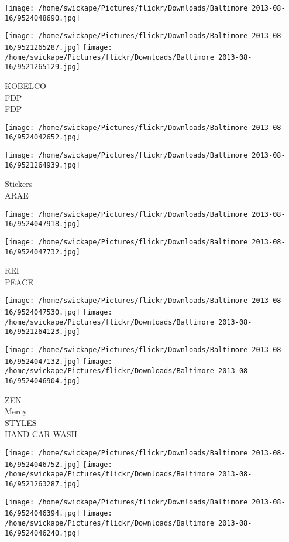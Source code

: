 \documentclass[10pt,letterpaper]{article}
\begin{document}
\texttt{[image: /home/swickape/Pictures/flickr/Downloads/Baltimore 2013-08-16/9524048690.jpg]}

\vspace{0.25in}
\texttt{[image: /home/swickape/Pictures/flickr/Downloads/Baltimore 2013-08-16/9521265287.jpg]}
\texttt{[image: /home/swickape/Pictures/flickr/Downloads/Baltimore 2013-08-16/9521265129.jpg]}

KOBELCO\\
FDP\\
FDP
\pagebreak

\texttt{[image: /home/swickape/Pictures/flickr/Downloads/Baltimore 2013-08-16/9524042652.jpg]}

\vspace{0.25in}
\texttt{[image: /home/swickape/Pictures/flickr/Downloads/Baltimore 2013-08-16/9521264939.jpg]}

Stickers\\
ARAE
\pagebreak

\texttt{[image: /home/swickape/Pictures/flickr/Downloads/Baltimore 2013-08-16/9524047918.jpg]}

\vspace{0.25in}
\texttt{[image: /home/swickape/Pictures/flickr/Downloads/Baltimore 2013-08-16/9524047732.jpg]}

REI\\
PEACE
\pagebreak

\texttt{[image: /home/swickape/Pictures/flickr/Downloads/Baltimore 2013-08-16/9524047530.jpg]}
\texttt{[image: /home/swickape/Pictures/flickr/Downloads/Baltimore 2013-08-16/9521264123.jpg]}

\texttt{[image: /home/swickape/Pictures/flickr/Downloads/Baltimore 2013-08-16/9524047132.jpg]}
\texttt{[image: /home/swickape/Pictures/flickr/Downloads/Baltimore 2013-08-16/9524046904.jpg]}

ZEN\\
Mercy\\
STYLES\\
HAND CAR WASH
\pagebreak

\texttt{[image: /home/swickape/Pictures/flickr/Downloads/Baltimore 2013-08-16/9524046752.jpg]}
\texttt{[image: /home/swickape/Pictures/flickr/Downloads/Baltimore 2013-08-16/9521263287.jpg]}

\texttt{[image: /home/swickape/Pictures/flickr/Downloads/Baltimore 2013-08-16/9524046394.jpg]}
\texttt{[image: /home/swickape/Pictures/flickr/Downloads/Baltimore 2013-08-16/9524046240.jpg]}
\end{document}
